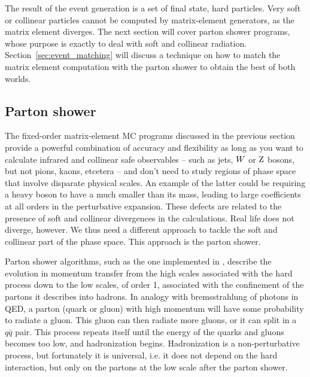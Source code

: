The result of the event generation is a set of final state, hard particles. Very
soft or collinear particles cannot be computed by matrix-element generators, as the matrix element
diverges. The next section will cover parton shower programs, whose purpose is exactly to deal with
soft and collinear radiation. Section~\ref{sec:event_matching} will discuss a technique on how to
match the matrix element computation with the parton shower to obtain the best of both worlds. 



\subsection{Parton shower}

The fixed-order matrix-element MC programs discussed in the previous section provide a powerful
combination of accuracy and flexibility as long as you want to calculate infrared and collinear safe
observables -- such as jets, $W$ or $\mathrm{Z}$ bosons, but not pions, kaons, etcetera -- and
don’t need to study regions of phase space that involve disparate physical scales. An example of
the latter could be requiring a heavy boson to have a \pt much smaller than its mass, leading to
large coefficients at all orders in the perturbative expansion.
These defects are related to the presence of soft and collinear divergences in the calculations.
Real life does not diverge, however. We thus need a different approach to tackle the soft and
collinear part of the phase space. This approach is the parton shower. 

Parton shower algorithms, such as the one implemented in \PYTHIA, describe the evolution in
momentum transfer from the high scales associated with the hard process down to the low scales, of
order 1\GeV, associated with the confinement of the partons it describes into hadrons. 
In analogy with bremsstrahlung of photons in QED, a parton (quark or gluon) with high momentum will
have some probability to radiate a gluon. This gluon can then radiate more gluons, or it can split
in a $q\bar{q}$ pair. This process repeats itself until the energy of the quarks and gluons becomes
too low, and hadronization begins. Hadronization is a non-perturbative process, but fortunately it
is universal, i.e. it does not depend on the hard interaction, but only on the partons at the low
scale after the parton shower.

